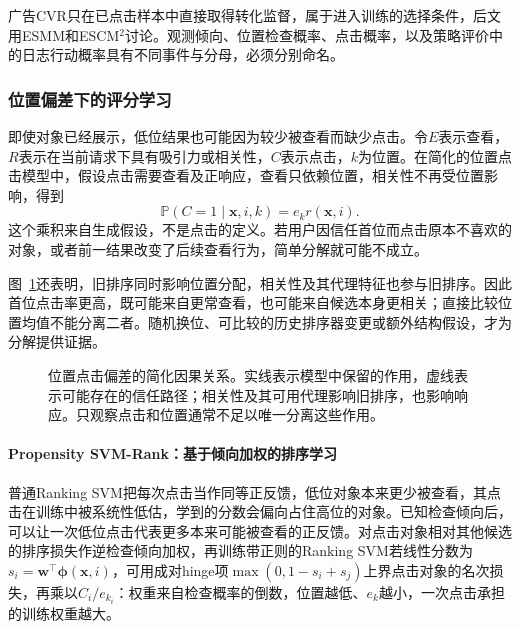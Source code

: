 广告CVR只在已点击样本中直接取得转化监督，属于进入训练的选择条件，后文用ESMM和ESCM$^2$讨论。观测倾向、位置检查概率、点击概率，以及策略评价中的日志行动概率具有不同事件与分母，必须分别命名。

\subsubsection{位置偏差下的评分学习}
\label{sec:rs-position-bias}

即使对象已经展示，低位结果也可能因为较少被查看而缺少点击。令$E$表示查看，$R$表示在当前请求下具有吸引力或相关性，$C$表示点击，$k$为位置。在简化的位置点击模型中，假设点击需要查看及正响应，查看只依赖位置，相关性不再受位置影响，得到
\begin{equation}
 \mathbb P(C=1\mid\bm x,i,k)=e_k r(\bm x,i).
 \label{eq:rs-pbm}
\end{equation}
这个乘积来自生成假设，不是点击的定义。若用户因信任首位而点击原本不喜欢的对象，或者前一结果改变了后续查看行为，简单分解就可能不成立。

图~\ref{fig:rs-position-paths}还表明，旧排序同时影响位置分配，相关性及其代理特征也参与旧排序。因此首位点击率更高，既可能来自更常查看，也可能来自候选本身更相关；直接比较位置均值不能分离二者。随机换位、可比较的历史排序器变更或额外结构假设，才为分解提供证据。
\begin{figure}[htbp]
 \centering
 
 \caption{位置点击偏差的简化因果关系。实线表示模型中保留的作用，虚线表示可能存在的信任路径；相关性及其可用代理影响旧排序，也影响响应。只观察点击和位置通常不足以唯一分离这些作用。}
 \label{fig:rs-position-paths}
\end{figure}

\paragraph{Propensity SVM-Rank：基于倾向加权的排序学习}
\label{sec:rs-propensity-svm}

普通Ranking SVM把每次点击当作同等正反馈，低位对象本来更少被查看，其点击在训练中被系统性低估，学到的分数会偏向占住高位的对象。已知检查倾向后，可以让一次低位点击代表更多本来可能被查看的正反馈。对点击对象相对其他候选的排序损失作逆检查倾向加权，再训练带正则的Ranking SVM若线性分数为$s_i=\bm w^\top\bm\phi(\bm x,i)$，可用成对hinge项$\max(0,1-s_i+s_j)$上界点击对象的名次损失，再乘以$C_i/e_{k_i}$：权重来自检查概率的倒数，位置越低、$e_k$越小，一次点击承担的训练权重越大。

